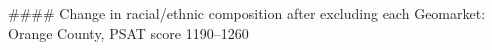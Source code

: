 #### Change in racial/ethnic composition after excluding each Geomarket: Orange County, PSAT score 1190–1260
